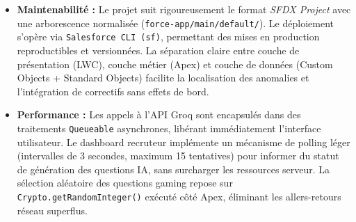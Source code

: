 \begin{itemize}
    \item \textbf{Maintenabilité :} Le projet suit rigoureusement le format \textit{SFDX Project} avec une arborescence normalisée (\texttt{force-app/main/default/}). Le déploiement s'opère via \texttt{Salesforce CLI (sf)}, permettant des mises en production reproductibles et versionnées. La séparation claire entre couche de présentation (LWC), couche métier (Apex) et couche de données (Custom Objects + Standard Objects) facilite la localisation des anomalies et l'intégration de correctifs sans effets de bord.

    \item \textbf{Performance :} Les appels à l'API Groq sont encapsulés dans des traitements \texttt{Queueable} asynchrones, libérant immédiatement l'interface utilisateur. Le dashboard recruteur implémente un mécanisme de polling léger (intervalles de 3 secondes, maximum 15 tentatives) pour informer du statut de génération des questions IA, sans surcharger les ressources serveur. La sélection aléatoire des questions gaming repose sur \texttt{Crypto.getRandomInteger()} exécuté côté Apex, éliminant les allers-retours réseau superflus.
\end{itemize}
